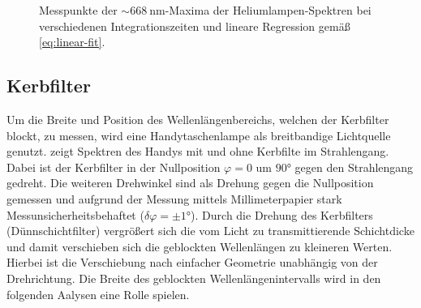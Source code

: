 \documentclass[../bericht.tex]{subfiles}
\begin{document}
        \begin{figure}
          \centering
          \caption[Messpunkte der $\sim\SI{668}{\nano\meter}$-Maxima der Heliumlampen-Spektren bei verschiedenen Integrationszeiten (vgl. \cref{fig:linearity}) und lineare Regression.]{Messpunkte der $\sim\SI{668}{\nano\meter}$-Maxima der Heliumlampen-Spektren bei verschiedenen Integrationszeiten und lineare Regression gemäß \cref{eq:linear-fit}.}
          \label{fig:linearitaet}
        \end{figure}


      \subsection{Kerbfilter}
      \label{subsec:kerbfilter}

        Um die Breite und Position des Wellenlängenbereichs, welchen der Kerbfilter blockt, zu messen, wird eine Handytaschenlampe als breitbandige Lichtquelle genutzt.  zeigt Spektren des Handys mit und ohne Kerbfilte im Strahlengang. Dabei ist der Kerbfilter in der Nullposition $\varphi=0$ um $\ang{90}$ gegen den Strahlengang gedreht. Die weiteren Drehwinkel sind als Drehung gegen die Nullposition gemessen und aufgrund der Messung mittels Millimeterpapier stark Messunsicherheitsbehaftet ($\delta \varphi=\pm \ang{1}$). Durch die Drehung des Kerbfilters (Dünnschichtfilter) vergrößert sich die vom Licht zu transmittierende Schichtdicke und damit verschieben sich die geblockten Wellenlängen zu kleineren Werten. Hierbei ist die Verschiebung nach einfacher Geometrie unabhängig von der Drehrichtung. Die Breite des geblockten Wellenlängenintervalls wird in den folgenden Aalysen eine Rolle spielen.
\end{document}

